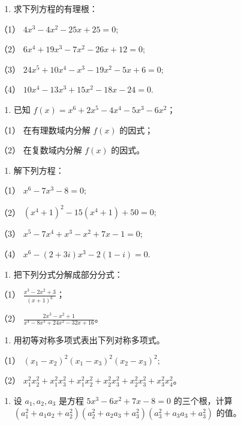 \begin{enumerate}[start=13]
\item
  求下列方程的有理根：
\end{enumerate}

（1） \(4x^{3} - 4x^{2} - 25x + 25 = 0;\)

（2） \(6x^{4} + 19x^{3} - 7x^{2} - 26x + 12 = 0;\)

（3） \(24x^{5} + 10x^{4} - x^{3} - 19x^{2} - 5x + 6 = 0;\)

（4） \(10x^{4} - 13x^{3} + 15x^{2} - 18x - 24 = 0.\)

\begin{enumerate}[start=14]
\item
  已知 \(f(x) = x^6 + 2x^5 - 4x^4 - 5x^3 - 6x^2\)；
\end{enumerate}

（1） 在有理数域内分解 \(f(x)\) 的因式；

（2） 在复数域内分解 \(f(x)\) 的因式。

\begin{enumerate}[start=15]
\item
  解下列方程：
\end{enumerate}

（1） \(x^{6} - 7x^{3} - 8 = 0;\)

（2） \((x^{4} + 1)^{2} - 15(x^{4} + 1) + 50 = 0;\)

（3） \(x^{5} - 7x^{4} + x^{3} - x^{2} + 7x - 1 = 0;\)

（4） \(x^{6} - (2 + 3i)x^{3} - 2(1 - i) = 0.\)

\begin{enumerate}[start=16]
\item
  把下列分式分解成部分分式：
\end{enumerate}

（1） \(\frac{x^3 - 2x^2 + 3}{(x + 1)^6}\)；

（2） \(\frac{2x^3 - x^2 + 1}{x^4 - 8x^3 + 24x^2 - 32x + 16}\)。

\begin{enumerate}[start=17]
\item
  用初等对称多项式表出下列对称多项式。
\end{enumerate}

（1） \((x_{1} - x_{2})^{2}(x_{1} - x_{3})^{2}(x_{2} - x_{3})^{2};\)

（2）
\(x_{1}^{2}x_{2}^{2} + x_{1}^{2}x_{3}^{2} + x_{1}^{2}x_{2}^{2} + x_{2}^{2}x_{3}^{2} + x_{2}^{2}x_{3}^{2} + x_{3}^{2}x_{4}^{2}\)。

\begin{enumerate}[start=18]
\item
  设 \(a_1, a_2, a_3\) 是方程 \(5x^3 - 6x^2 + 7x - 8 = 0\)
  的三个根，计算
  \((a_1^2 + a_1a_2 + a_2^2)(a_2^2 + a_2a_3 + a_3^2)(a_3^2 + a_3a_3 + a_3^2)\)
  的值。
\end{enumerate}

